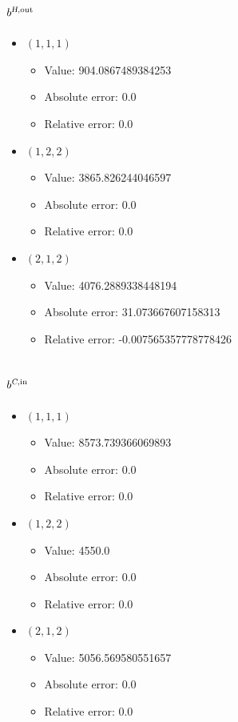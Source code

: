 \documentclass{article}%
\begin{document}
\subsection{$b^{\textsl{H},\text{out}}$}%
\begin{itemize}%
	\item $(1, 1, 1)$%
	\begin{itemize}%
		\item Value: 904.0867489384253%
		\item Absolute error: 0.0%
		\item Relative error: 0.0%
	\end{itemize}%
	\item $(1, 2, 2)$%
	\begin{itemize}%
		\item Value: 3865.826244046597%
		\item Absolute error: 0.0%
		\item Relative error: 0.0%
	\end{itemize}%
	\item $(2, 1, 2)$%
	\begin{itemize}%
		\item Value: 4076.2889338448194%
		\item Absolute error: 31.073667607158313%
		\item Relative error: -0.007565357778778426%
	\end{itemize}%
\end{itemize}%
\subsection{$b^{\textsl{C},\text{in}}$}%
\begin{itemize}%
	\item $(1, 1, 1)$%
	\begin{itemize}%
		\item Value: 8573.739366069893%
		\item Absolute error: 0.0%
		\item Relative error: 0.0%
	\end{itemize}%
	\item $(1, 2, 2)$%
	\begin{itemize}%
		\item Value: 4550.0%
		\item Absolute error: 0.0%
		\item Relative error: 0.0%
	\end{itemize}%
	\item $(2, 1, 2)$%
	\begin{itemize}%
		\item Value: 5056.569580551657%
		\item Absolute error: 0.0%
		\item Relative error: 0.0%
	\end{itemize}%
\end{itemize}%
\end{document}
